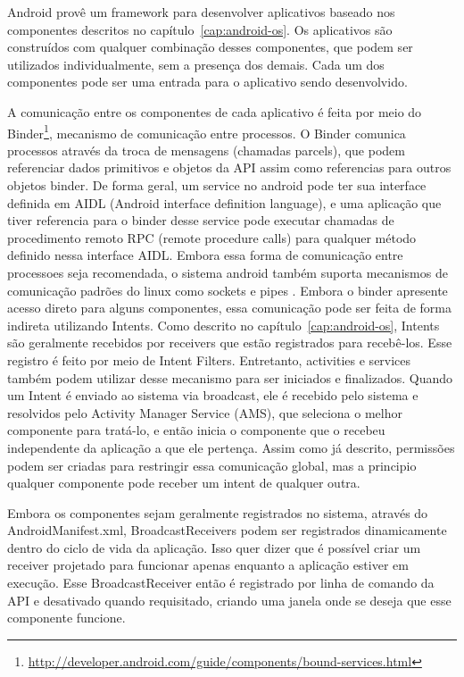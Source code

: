 Android provê um framework para desenvolver aplicativos baseado nos componentes descritos no capítulo~\ref{cap:android-os}. Os aplicativos são construídos com qualquer combinação desses componentes, que podem ser utilizados individualmente, sem a presença dos demais. Cada um dos componentes pode ser uma entrada para o aplicativo sendo desenvolvido.

A comunicação entre os componentes de cada aplicativo é feita por meio do Binder\footnote{\url{http://developer.android.com/guide/components/bound-services.html}}, mecanismo de comunicação entre processos. O Binder comunica processos através da troca de mensagens (chamadas parcels), que podem referenciar dados primitivos e objetos da API assim como referencias para outros objetos binder. De forma geral, um service no android pode ter sua interface definida em AIDL (Android interface definition language), e uma aplicação que tiver referencia para o binder desse service pode executar chamadas de procedimento remoto RPC (remote procedure calls) para qualquer método definido nessa interface AIDL. Embora essa forma de comunicação entre processoes seja recomendada, o sistema android também suporta mecanismos de comunicação padrões do linux como sockets e pipes \cite{heuser2014}. Embora o binder apresente acesso direto para alguns componentes, essa comunicação pode ser feita de forma indireta utilizando Intents. Como descrito no capítulo~\ref{cap:android-os}, Intents são geralmente recebidos por receivers que estão registrados para recebê-los. Esse registro é feito por meio de Intent Filters. Entretanto, activities e services também podem utilizar desse mecanismo para ser iniciados e finalizados. Quando um Intent é enviado ao sistema via broadcast, ele é recebido pelo sistema e resolvidos pelo Activity Manager Service (AMS), que seleciona o melhor componente para tratá-lo, e então inicia o componente que o recebeu independente da aplicação a que ele pertença. Assim como já descrito, permissões podem ser criadas para restringir essa comunicação global, mas a principio qualquer componente pode receber um intent de qualquer outra. 

Embora os componentes sejam geralmente registrados no sistema, através do AndroidManifest.xml, BroadcastReceivers podem ser registrados dinamicamente dentro do ciclo de vida da aplicação. Isso quer dizer que é possível criar um receiver projetado para funcionar apenas enquanto a aplicação estiver em execução. Esse BroadcastReceiver então é registrado por linha de comando da API e desativado quando requisitado, criando uma janela onde se deseja que esse componente funcione.

